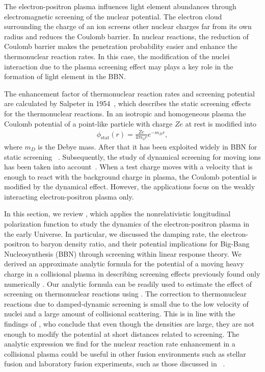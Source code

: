 The electron-positron plasma influences light element abundances through electromagnetic screening of the nuclear potential. The electron cloud surrounding the charge of an ion screens other nuclear charges far from its own radius and reduces the Coulomb barrier. In nuclear reactions, the reduction of Coulomb barrier makes the penetration probability easier and enhance the thermonuclear reaction rates. In this case, the modification of the nuclei interaction due to the plasma screening effect may plays a key role in the formation of light element in the BBN. 

The enhancement factor of thermonuclear reaction rates and screening potential are calculated by Salpeter in 1954~\cite{Salpeter:1954nc}, which describes the static screening effects for the thermonuclear reactions. In an isotropic and homogeneous plasma the Coulomb potential of a point-like particle with charge $Ze$ at rest is modified into~\cite{Salpeter:1954nc}
\begin{align}
\phi_\text{stat}(r)=\frac{Ze}{4\pi\epsilon_0 r}e^{-m_Dr},
\end{align}
where $m_D$ is the Debye mass. After that it has been exploited widely in BBN for static screening ~\cite{1969ApJ...155..183S,Famiano:2016hhs}. Subsequently, the study of dynamical screening for moving ions has been taken into account~\cite{1988ApJ...331..565C,Gruzinov:1997as,Hwang:2021kno}. When a test charge moves with a velocity that is enough to react with the background charge in plasma, the Coulomb potential is modified by the dynamical effect. However, the applications focus on the weakly interacting electron-positron plasma only. 


In this section, we review \cite{Grayson:2023flr}, which applies the nonrelativistic longitudinal polarization function to study the dynamics of the electron-positron plasma in the early Universe. In particular, we discussed the damping rate, the electron-positron to baryon density ratio, and their potential implications for Big-Bang Nucleosynthesis (BBN) through screening within linear response theory. We derived an approximate analytic formula for the potential of a moving heavy charge in a collisional plasma in  describing screening effects previously found only numerically \cite{Hwang:2021kno}. Our analytic formula can be readily used to estimate the effect of screening on thermonuclear reactions using . The correction to thermonuclear reactions due to damped-dynamic screening is small due to the low velocity of nuclei and a large amount of collisional scattering. This is in line with the findings of \cite{Hwang:2021kno}, who conclude that even though the densities are large, they are not enough to modify the potential at short distances related to screening. The analytic expression we find for the nuclear reaction rate enhancement  in a collisional plasma could be useful in other fusion environments such as stellar fusion and laboratory fusion experiments, such as those discussed in ~\cite{Labaune:2013dla,Margarone:2022mdpi}.


